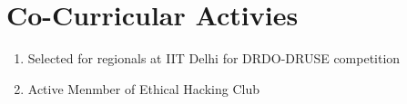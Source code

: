 \documentclass[11pt,a4paper,sans]{moderncv} %
\begin{document}
\section{Co-Curricular Activies}
		\begin{enumerate}
			\item Selected for regionals at IIT Delhi for DRDO-DRUSE competition
			\newline{}
			\item Active Menmber of Ethical Hacking Club
			\newline{} 
			
		\end{enumerate}	
\end{document}
